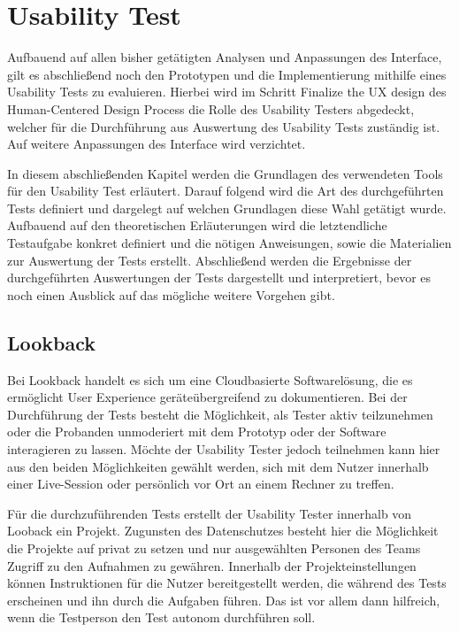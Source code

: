 \chapter{Usability Test}\label{ch:outlook}

Aufbauend auf allen bisher getätigten Analysen und Anpassungen des Interface, gilt es abschließend noch den Prototypen und die Implementierung mithilfe eines Usability Tests zu evaluieren.
Hierbei wird im Schritt \glqq Finalize the UX design\grqq{} des Human-Centered Design Process die Rolle des Usability Testers abgedeckt, welcher für die Durchführung aus Auswertung des Usability Tests zuständig ist.
Auf weitere Anpassungen des Interface wird verzichtet.

In diesem abschließenden Kapitel werden die Grundlagen des verwendeten Tools für den Usability Test erläutert.
Darauf folgend wird die Art des durchgeführten Tests definiert und dargelegt auf welchen Grundlagen diese Wahl getätigt wurde.
Aufbauend auf den theoretischen Erläuterungen wird die letztendliche Testaufgabe konkret definiert und die nötigen Anweisungen, sowie die Materialien zur Auswertung der Tests erstellt.
Abschließend werden die Ergebnisse der durchgeführten Auswertungen der Tests dargestellt und interpretiert, bevor es noch einen Ausblick auf das mögliche weitere Vorgehen gibt.

\section{Lookback}

Bei Lookback handelt es sich um eine Cloudbasierte Softwarelösung, die es ermöglicht User Experience geräteübergreifend zu dokumentieren.
Bei der Durchführung der Tests besteht die Möglichkeit, als Tester aktiv teilzunehmen oder die Probanden unmoderiert mit dem Prototyp oder der Software interagieren zu lassen.
Möchte der Usability Tester jedoch teilnehmen kann hier aus den beiden Möglichkeiten gewählt werden, sich mit dem Nutzer innerhalb einer Live-Session oder persönlich vor Ort an einem Rechner zu treffen.

Für die durchzuführenden Tests erstellt der Usability Tester innerhalb von Looback ein Projekt.
Zugunsten des Datenschutzes besteht hier die Möglichkeit die Projekte auf privat zu setzen und nur ausgewählten Personen des Teams Zugriff zu den Aufnahmen zu gewähren.
Innerhalb der Projekteinstellungen können Instruktionen für die Nutzer bereitgestellt werden, die während des Tests erscheinen und ihn durch die Aufgaben führen.
Das ist vor allem dann hilfreich, wenn die Testperson den Test autonom durchführen soll.


